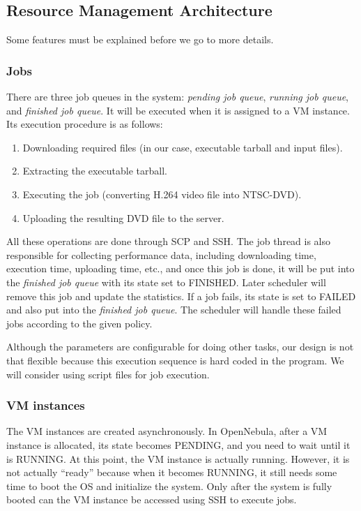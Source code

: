 \subsection{Resource Management Architecture}
Some features must be explained before we go to more details.

\subsubsection{Jobs}
There are three job queues in the system: \emph{pending job queue}, \emph{running job queue}, and \emph{finished job queue}. It will be executed when it is assigned to a VM instance. Its execution procedure is as follows:

\begin{enumerate}
\item Downloading required files (in our case, executable tarball and input files).
\item Extracting the executable tarball.
\item Executing the job (converting H.264 video file into NTSC-DVD).
\item Uploading the resulting DVD file to the server.
\end{enumerate}

All these operations are done through SCP and SSH. The job thread is also responsible for collecting performance data, including downloading time, execution time, uploading time, etc., and once this job is done, it will be put into the \emph{finished job queue} with its state set to FINISHED. Later scheduler will remove this job and update the statistics. If a job fails, its state is set to FAILED and also put into the \emph{finished job queue}. The scheduler will handle these failed jobs according to the given policy.

Although the parameters are configurable for doing other tasks, our design is not that flexible because this execution sequence is hard coded in the program. We will consider using script files for job execution.


\subsubsection{VM instances}
The VM instances are created asynchronously. In OpenNebula, after a VM instance is allocated, its state becomes PENDING, and you need to wait until it is RUNNING. At this point, the VM instance is actually running. However, it is not actually ``ready'' because when it becomes RUNNING, it still needs some time to boot the OS and initialize the system. Only after the system is fully booted can the VM instance be accessed using SSH to execute jobs.

